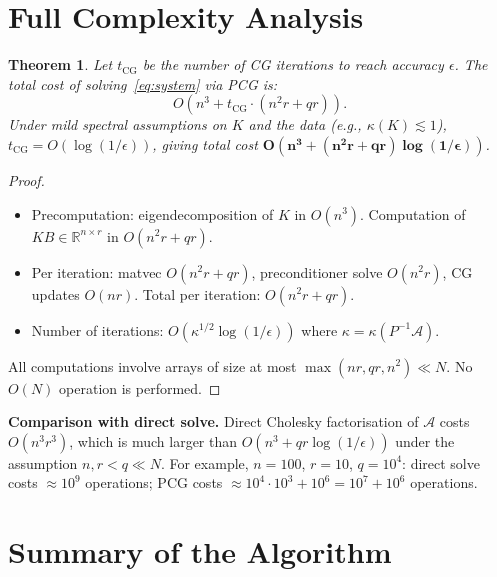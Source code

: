 \documentclass[12pt]{article}
\newtheorem{theorem}{Theorem}
\theoremstyle{definition}
\theoremstyle{remark}
\begin{document}
\section{Full Complexity Analysis}

\begin{theorem}\label{thm:complexity}
Let $t_{\mathrm{CG}}$ be the number of CG iterations to reach accuracy
$\epsilon$.  The total cost of solving~\eqref{eq:system} via PCG is:
\[
  O\!\left(n^3 + t_{\mathrm{CG}}\cdot(n^2r + qr)\right).
\]
Under mild spectral assumptions on $K$ and the data (e.g.,
$\kappa(K)\lesssim 1$), $t_{\mathrm{CG}} = O(\log(1/\epsilon))$, giving
total cost $\mathbf{O(n^3 + (n^2 r + qr)\log(1/\epsilon))}$.
\end{theorem}

\begin{proof}
\begin{itemize}
\item Precomputation: eigendecomposition of $K$ in $O(n^3)$.
  Computation of $KB\in\mathbb{R}^{n\times r}$ in $O(n^2r + qr)$.
\item Per iteration: matvec $O(n^2r+qr)$, preconditioner solve $O(n^2r)$,
  CG updates $O(nr)$.  Total per iteration: $O(n^2r + qr)$.
\item Number of iterations: $O(\kappa^{1/2}\log(1/\epsilon))$ where
  $\kappa = \kappa(P^{-1}\mathcal{A})$.
\end{itemize}
All computations involve arrays of size at most $\max(nr,qr,n^2) \ll N$.
No $O(N)$ operation is performed.
\end{proof}

\noindent\textbf{Comparison with direct solve.}
Direct Cholesky factorisation of $\mathcal{A}$ costs $O(n^3r^3)$, which is
much larger than $O(n^3 + qr\log(1/\epsilon))$ under the assumption $n,r<q\ll N$.
For example, $n=100$, $r=10$, $q=10^4$: direct solve costs $\approx 10^9$
operations; PCG costs $\approx 10^4\cdot 10^3 + 10^6 = 10^7 + 10^6$
operations.

\section{Summary of the Algorithm}
\end{document}
